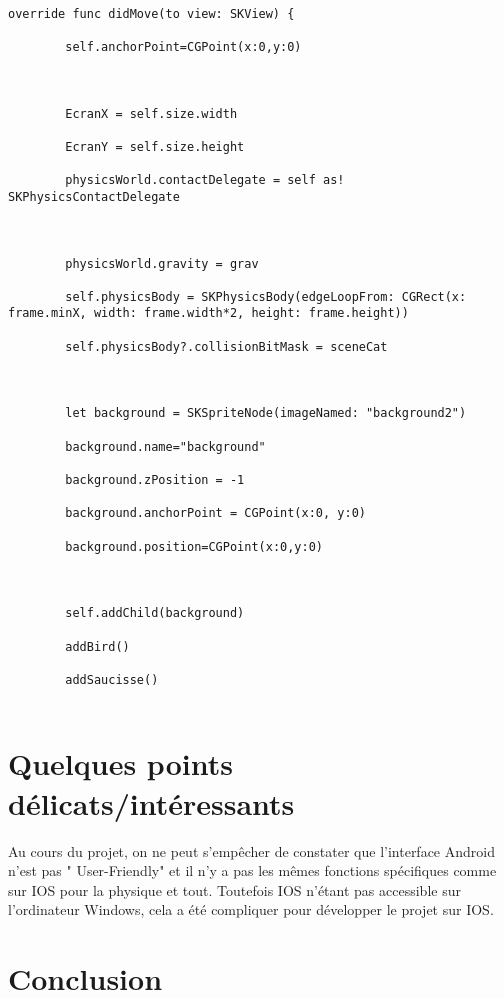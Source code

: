 \documentclass{article}
\begin{document}
\begin{verbatim}

override func didMove(to view: SKView) {

        self.anchorPoint=CGPoint(x:0,y:0)

        

        EcranX = self.size.width

        EcranY = self.size.height

        physicsWorld.contactDelegate = self as! SKPhysicsContactDelegate

        

        physicsWorld.gravity = grav

        self.physicsBody = SKPhysicsBody(edgeLoopFrom: CGRect(x: frame.minX, width: frame.width*2, height: frame.height))

        self.physicsBody?.collisionBitMask = sceneCat

        

        let background = SKSpriteNode(imageNamed: "background2")

        background.name="background"

        background.zPosition = -1

        background.anchorPoint = CGPoint(x:0, y:0)

        background.position=CGPoint(x:0,y:0)

        

        self.addChild(background)

        addBird()

        addSaucisse()
    
\end{verbatim}








\section{Quelques points délicats/intéressants}

Au cours du projet, on ne peut s’empêcher de constater que l'interface Android n'est pas " User-Friendly" et il n'y a pas les mêmes fonctions spécifiques comme sur IOS pour la physique et tout. Toutefois IOS n'étant pas accessible sur l’ordinateur Windows, cela a été compliquer pour développer le projet sur IOS.


\section{Conclusion}
\end{document}
